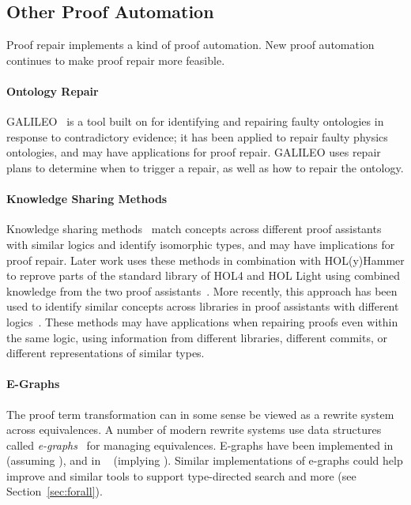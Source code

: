 \subsection{Other Proof Automation}
\label{sec:automation}

Proof repair implements a kind of proof automation.
New proof automation continues to make proof repair more feasible.

\paragraph{Ontology Repair}
GALILEO~\cite{chan2011galileo} is a tool built on  for identifying and repairing faulty ontologies in response to contradictory
evidence; it has been applied to repair faulty physics ontologies, and may have applications for proof repair.
GALILEO uses repair plans to determine when to trigger a repair, as well as how to repair the ontology.

\paragraph{Knowledge Sharing Methods}
Knowledge sharing methods~\cite{gauthier2014} match concepts across
different proof assistants with similar logics and identify isomorphic types,
and may have implications for proof repair.
Later work uses these methods in combination with HOL(y)Hammer to
reprove parts of the standard library of HOL4 and HOL Light using combined knowledge 
from the two proof assistants~\cite{Gauthier2015}. 
More recently, this approach has been used to identify similar concepts
across libraries in proof assistants with different logics~\cite{gauthier2017}.
These methods may have applications
when repairing proofs even within the same logic, using information from different 
libraries, different commits, or different representations of similar types.

\paragraph{E-Graphs} %
The \toolnamec proof term transformation can in some sense be viewed as a rewrite system across equivalences.
A number of modern rewrite systems use data structures called \textit{e-graphs}~\cite{egraph1} for managing equivalences.
E-graphs have been implemented in ~\cite{selsam:lean} (assuming ),
and in ~\cite{egraph6} (implying ).
Similar implementations of e-graphs could help improve \toolnamec and similar tools to support
type-directed search and more (see Section~\ref{sec:forall}).

